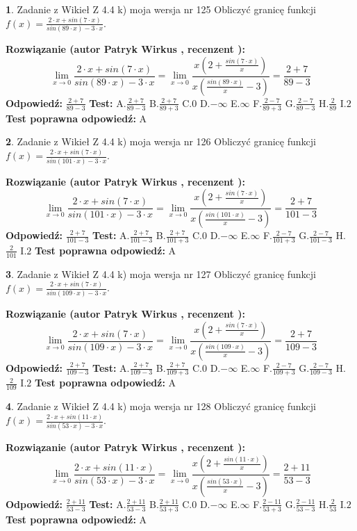 \documentclass[12pt, a4paper]{article}
\theoremstyle{definition} %
\newtheorem{zad}{}
\newcommand{\zadStart}[1]{\begin{zad}#1\newline}
\newcommand{\zadStop}{\end{zad}}
\newcommand{\rozwStart}[2]{\noindent \textbf{Rozwiązanie (autor #1 , recenzent #2): }\newline}
\newcommand{\rozwStop}{\newline}
\newcommand{\odpStart}{\noindent \textbf{Odpowiedź:}\newline}
\newcommand{\odpStop}{\newline}
\newcommand{\testStart}{\noindent \textbf{Test:}\newline}
\newcommand{\testStop}{\newline}
\newcommand{\kluczStart}{\noindent \textbf{Test poprawna odpowiedź:}\newline}
\newcommand{\kluczStop}{\newline}
\begin{document}
\zadStart{Zadanie z Wikieł Z 4.4 k) moja wersja nr 125}
Obliczyć granicę funkcji $f(x)=\frac{2\cdot x +sin(7\cdot x)}{sin(89\cdot x) -3\cdot x}$.
\zadStop
\rozwStart{Patryk Wirkus}{}
$$\lim\limits_{x\to 0}\frac{2\cdot x +sin(7\cdot x)}{sin(89\cdot x) -3\cdot x}
=\lim\limits_{x\to 0}\frac{x(2+\frac{sin(7\cdot x)}{x})}{x(\frac{sin(89\cdot x)}{x}-3)}
=\frac{2+7}{89-3}$$
\rozwStop
\odpStart
$\frac{2+7}{89-3}$
\odpStop
\testStart
A.$\frac{2+7}{89-3}$
B.$\frac{2+7}{89+3}$
C.$0$
D.$-\infty$
E.$\infty$
F.$\frac{2-7}{89+3}$
G.$\frac{2-7}{89-3}$
H.$\frac{2}{89}$
I.$2$
\testStop
\kluczStart
A
\kluczStop



\zadStart{Zadanie z Wikieł Z 4.4 k) moja wersja nr 126}
Obliczyć granicę funkcji $f(x)=\frac{2\cdot x +sin(7\cdot x)}{sin(101\cdot x) -3\cdot x}$.
\zadStop
\rozwStart{Patryk Wirkus}{}
$$\lim\limits_{x\to 0}\frac{2\cdot x +sin(7\cdot x)}{sin(101\cdot x) -3\cdot x}
=\lim\limits_{x\to 0}\frac{x(2+\frac{sin(7\cdot x)}{x})}{x(\frac{sin(101\cdot x)}{x}-3)}
=\frac{2+7}{101-3}$$
\rozwStop
\odpStart
$\frac{2+7}{101-3}$
\odpStop
\testStart
A.$\frac{2+7}{101-3}$
B.$\frac{2+7}{101+3}$
C.$0$
D.$-\infty$
E.$\infty$
F.$\frac{2-7}{101+3}$
G.$\frac{2-7}{101-3}$
H.$\frac{2}{101}$
I.$2$
\testStop
\kluczStart
A
\kluczStop



\zadStart{Zadanie z Wikieł Z 4.4 k) moja wersja nr 127}
Obliczyć granicę funkcji $f(x)=\frac{2\cdot x +sin(7\cdot x)}{sin(109\cdot x) -3\cdot x}$.
\zadStop
\rozwStart{Patryk Wirkus}{}
$$\lim\limits_{x\to 0}\frac{2\cdot x +sin(7\cdot x)}{sin(109\cdot x) -3\cdot x}
=\lim\limits_{x\to 0}\frac{x(2+\frac{sin(7\cdot x)}{x})}{x(\frac{sin(109\cdot x)}{x}-3)}
=\frac{2+7}{109-3}$$
\rozwStop
\odpStart
$\frac{2+7}{109-3}$
\odpStop
\testStart
A.$\frac{2+7}{109-3}$
B.$\frac{2+7}{109+3}$
C.$0$
D.$-\infty$
E.$\infty$
F.$\frac{2-7}{109+3}$
G.$\frac{2-7}{109-3}$
H.$\frac{2}{109}$
I.$2$
\testStop
\kluczStart
A
\kluczStop



\zadStart{Zadanie z Wikieł Z 4.4 k) moja wersja nr 128}
Obliczyć granicę funkcji $f(x)=\frac{2\cdot x +sin(11\cdot x)}{sin(53\cdot x) -3\cdot x}$.
\zadStop
\rozwStart{Patryk Wirkus}{}
$$\lim\limits_{x\to 0}\frac{2\cdot x +sin(11\cdot x)}{sin(53\cdot x) -3\cdot x}
=\lim\limits_{x\to 0}\frac{x(2+\frac{sin(11\cdot x)}{x})}{x(\frac{sin(53\cdot x)}{x}-3)}
=\frac{2+11}{53-3}$$
\rozwStop
\odpStart
$\frac{2+11}{53-3}$
\odpStop
\testStart
A.$\frac{2+11}{53-3}$
B.$\frac{2+11}{53+3}$
C.$0$
D.$-\infty$
E.$\infty$
F.$\frac{2-11}{53+3}$
G.$\frac{2-11}{53-3}$
H.$\frac{2}{53}$
I.$2$
\testStop
\kluczStart
A
\kluczStop
\end{document}
